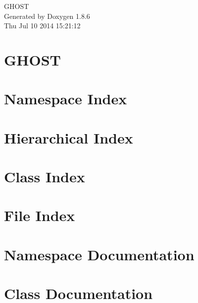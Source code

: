 \documentclass[twoside]{book}
\newcommand{\clearemptydoublepage}{%
  \newpage{\pagestyle{empty}\cleardoublepage}%
}
\begin{document}
\hypersetup{pageanchor=false}
\begin{titlepage}
\vspace*{7cm}
\begin{center}%
{\Large G\-H\-O\-S\-T }\\
\vspace*{1cm}
{\large Generated by Doxygen 1.8.6}\\
\vspace*{0.5cm}
{\small Thu Jul 10 2014 15:21:12}\\
\end{center}
\end{titlepage}
\clearemptydoublepage
\tableofcontents
\clearemptydoublepage
{}
\hypersetup{pageanchor=true}

\chapter{G\-H\-O\-S\-T}
\label{index}\hypertarget{index}{}
\chapter{Namespace Index}

\chapter{Hierarchical Index}

\chapter{Class Index}

\chapter{File Index}

\chapter{Namespace Documentation}

\chapter{Class Documentation}






















\end{document}
